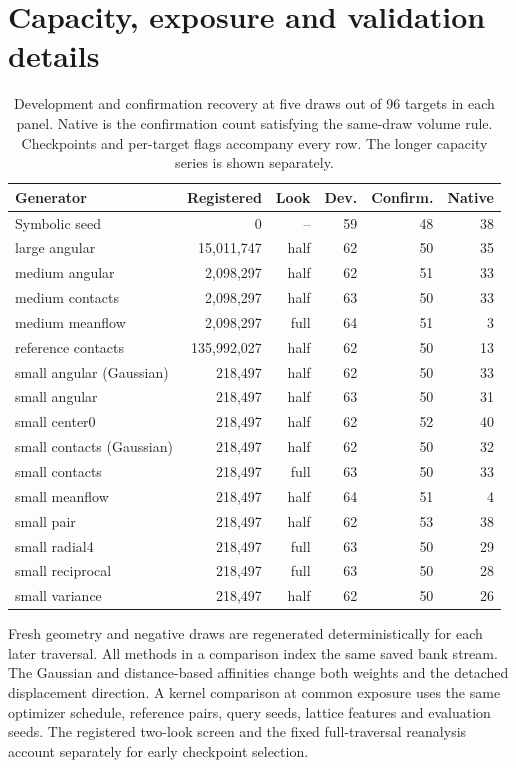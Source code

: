 \section{Capacity, exposure and validation details}

\begin{table}[!htbp]\centering\small\setlength{\tabcolsep}{3.6pt}
\caption{Development and confirmation recovery at five draws out of 96 targets in each panel. Native is the confirmation count satisfying the same-draw volume rule. Checkpoints and per-target flags accompany every row. The longer capacity series is shown separately.}
\begin{tabular}{lrrrrr}\hline
Generator & Registered & Look & Dev. & Confirm. & Native\\\hline
Symbolic seed & 0 & -- & 59 & 48 & 38\\
large angular & 15,011,747 & half & 62 & 50 & 35\\
medium angular & 2,098,297 & half & 62 & 51 & 33\\
medium contacts & 2,098,297 & half & 63 & 50 & 33\\
medium meanflow & 2,098,297 & full & 64 & 51 & 3\\
reference contacts & 135,992,027 & half & 62 & 50 & 13\\
small angular (Gaussian) & 218,497 & half & 62 & 50 & 33\\
small angular & 218,497 & half & 63 & 50 & 31\\
small center0 & 218,497 & half & 62 & 52 & 40\\
small contacts (Gaussian) & 218,497 & half & 62 & 50 & 32\\
small contacts & 218,497 & full & 63 & 50 & 33\\
small meanflow & 218,497 & half & 64 & 51 & 4\\
small pair & 218,497 & half & 62 & 53 & 38\\
small radial4 & 218,497 & full & 63 & 50 & 29\\
small reciprocal & 218,497 & full & 63 & 50 & 28\\
small variance & 218,497 & half & 62 & 50 & 26\\
\hline\end{tabular}\end{table}

Fresh geometry and negative draws are regenerated deterministically for each later traversal. All methods in a comparison index the same saved bank stream. The Gaussian and distance-based affinities change both weights and the detached displacement direction. A kernel comparison at common exposure uses the same optimizer schedule, reference pairs, query seeds, lattice features and evaluation seeds. The registered two-look screen and the fixed full-traversal reanalysis account separately for early checkpoint selection.
